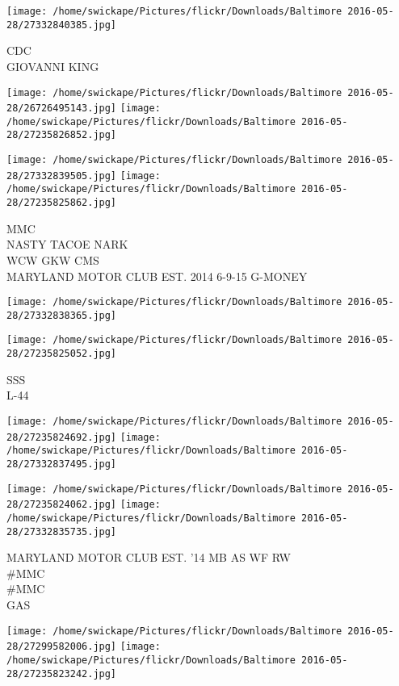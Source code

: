 \documentclass[10pt,letterpaper]{article}
\begin{document}
\vspace{0.25in}
\texttt{[image: /home/swickape/Pictures/flickr/Downloads/Baltimore 2016-05-28/27332840385.jpg]}

CDC\\
GIOVANNI KING
\pagebreak

\texttt{[image: /home/swickape/Pictures/flickr/Downloads/Baltimore 2016-05-28/26726495143.jpg]}
\texttt{[image: /home/swickape/Pictures/flickr/Downloads/Baltimore 2016-05-28/27235826852.jpg]}

\texttt{[image: /home/swickape/Pictures/flickr/Downloads/Baltimore 2016-05-28/27332839505.jpg]}
\texttt{[image: /home/swickape/Pictures/flickr/Downloads/Baltimore 2016-05-28/27235825862.jpg]}

MMC\\
NASTY TACOE NARK\\
WCW GKW CMS\\
MARYLAND MOTOR CLUB EST. 2014 6{-}9{-}15 G{-}MONEY
\pagebreak

\texttt{[image: /home/swickape/Pictures/flickr/Downloads/Baltimore 2016-05-28/27332838365.jpg]}

\vspace{0.25in}
\texttt{[image: /home/swickape/Pictures/flickr/Downloads/Baltimore 2016-05-28/27235825052.jpg]}

SSS\\
L{-}44
\pagebreak

\texttt{[image: /home/swickape/Pictures/flickr/Downloads/Baltimore 2016-05-28/27235824692.jpg]}
\texttt{[image: /home/swickape/Pictures/flickr/Downloads/Baltimore 2016-05-28/27332837495.jpg]}

\texttt{[image: /home/swickape/Pictures/flickr/Downloads/Baltimore 2016-05-28/27235824062.jpg]}
\texttt{[image: /home/swickape/Pictures/flickr/Downloads/Baltimore 2016-05-28/27332835735.jpg]}

MARYLAND MOTOR CLUB EST. '14 MB AS WF RW\\
\#MMC\\
\#MMC\\
GAS
\pagebreak

\texttt{[image: /home/swickape/Pictures/flickr/Downloads/Baltimore 2016-05-28/27299582006.jpg]}
\texttt{[image: /home/swickape/Pictures/flickr/Downloads/Baltimore 2016-05-28/27235823242.jpg]}
\end{document}
